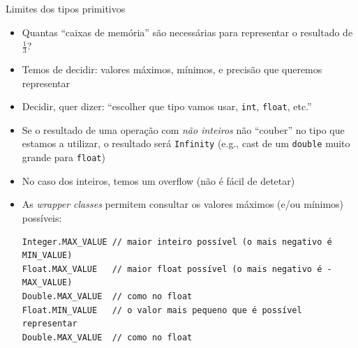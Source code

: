 \documentclass[portuguese, aspectratio=169, xcolor=table]{beamer}
\begin{document}
\begin{frame}[fragile]{Limites dos tipos primitivos}
\begin{itemize}
    \item Quantas ``caixas de memória'' são necessárias para representar o resultado de $\frac{1}{3}$?
    \item Temos de decidir: valores máximos, mínimos, e precisão que queremos representar
    \item Decidir, quer dizer: ``escolher que tipo vamos usar, \texttt{int}, \texttt{float}, etc.''
    \item Se o resultado de uma operação com \textit{não inteiros} não ``couber'' no tipo que estamos a utilizar, o resultado será \texttt{Infinity} (e.g., cast de um \texttt{double} muito grande para \texttt{float})
    \item No caso dos inteiros, temos um overflow (não é fácil de detetar)
    \item As \textit{wrapper classes} permitem consultar os valores máximos (e/ou mínimos) possíveis:
\begin{verbatim}
Integer.MAX_VALUE // maior inteiro possível (o mais negativo é MIN_VALUE)
Float.MAX_VALUE   // maior float possível (o mais negativo é -MAX_VALUE)
Double.MAX_VALUE  // como no float
Float.MIN_VALUE   // o valor mais pequeno que é possível representar
Double.MAX_VALUE  // como no float
\end{verbatim}
\end{itemize}
\end{frame}
\end{document}
